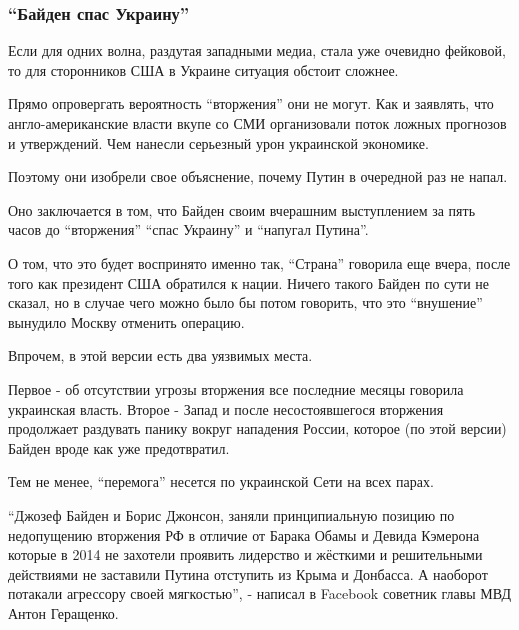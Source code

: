  
 
 
 
 

\subsubsection{\enquote{Байден спас Украину}}
\label{sec:16_02_2022.stz.news.ua.strana.4.putin_ne_napal.3.bajden_spas_ukrainu}

Если для одних волна, раздутая западными медиа, стала уже очевидно фейковой, то
для сторонников США в Украине ситуация обстоит сложнее. 

Прямо опровергать вероятность \enquote{вторжения} они не могут. Как и заявлять,
что англо-американские власти вкупе со СМИ организовали поток ложных прогнозов
и утверждений. Чем нанесли серьезный урон украинской экономике. 

Поэтому они изобрели свое объяснение, почему Путин в очередной раз не напал.

Оно заключается в том, что Байден своим вчерашним выступлением за пять часов до
\enquote{вторжения} \enquote{спас Украину} и \enquote{напугал Путина}. 

О том, что это будет воспринято именно так, \enquote{Страна} говорила еще
вчера, после того как президент США обратился к нации. Ничего такого Байден по
сути не сказал, но в случае чего можно было бы потом говорить, что это
\enquote{внушение} вынудило Москву отменить операцию. 

Впрочем, в этой версии есть два уязвимых места.

Первое - об отсутствии угрозы вторжения все последние месяцы говорила
украинская власть. Второе - Запад и после несостоявшегося вторжения продолжает
раздувать панику вокруг нападения России, которое (по этой версии) Байден вроде
как уже предотвратил.

Тем не менее, \enquote{перемога} несется по украинской Сети на всех парах. 

\enquote{Джозеф Байден и Борис Джонсон, заняли принципиальную позицию по
недопущению вторжения РФ в отличие от Барака Обамы и Девида Кэмерона которые в
2014 не захотели проявить лидерство и жёсткими и решительными действиями не
заставили Путина отступить из Крыма и Донбасса. А наоборот потакали агрессору
своей мягкостью}, - написал в Facebook советник главы МВД Антон Геращенко.

